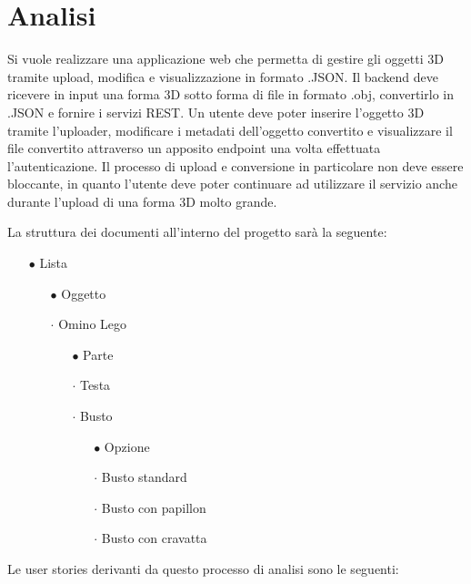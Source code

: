 \section{Analisi}
Si vuole realizzare una applicazione web che permetta di gestire gli oggetti 3D tramite upload, modifica e visualizzazione in formato .JSON.
Il backend deve ricevere in input una forma 3D sotto forma di file in formato .obj, convertirlo in .JSON e fornire i servizi REST.
Un utente deve poter inserire l'oggetto 3D tramite l'uploader, modificare i metadati dell'oggetto convertito e visualizzare il file convertito attraverso un apposito endpoint una volta effettuata l'autenticazione.
Il processo di upload e conversione in particolare non deve essere bloccante, in quanto l'utente deve poter continuare ad utilizzare il servizio anche durante l'upload di una forma 3D molto grande.

La struttura dei documenti all'interno del progetto sarà la seguente:
\begin{itemize}
	\item[$\bullet$] Lista
	\begin{itemize}
		\item[$\bullet$] Oggetto
		\item[$\cdot$] Omino Lego
		\begin{itemize}
			\item[$\bullet$] Parte
			\item[$\cdot$] Testa
			\item[$\cdot$] Busto
			\begin{itemize}
				\item[$\bullet$] Opzione
				\item[$\cdot$] Busto standard
				\item[$\cdot$] Busto con papillon
				\item[$\cdot$] Busto con cravatta
			\end{itemize}
		\end{itemize}
	\end{itemize}
\end{itemize}

Le user stories derivanti da questo processo di analisi sono le seguenti:

